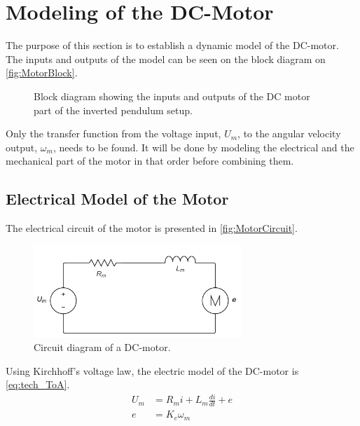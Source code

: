 \section{Modeling of the DC-Motor}
The purpose of this section is to establish a dynamic model of the DC-motor. The inputs and outputs of the model can be seen on the block diagram on \autoref{fig:MotorBlock}.
\begin{figure}[htbp]
\centering
{}
\caption{Block diagram showing the inputs and outputs of the DC motor part of the inverted pendulum setup.}
\label{fig:MotorBlock}
\end{figure}

Only the transfer function from the voltage input, $U_m$, to the angular velocity output, $\omega_m$, needs to be found. It will be done by modeling the electrical and the mechanical part of the motor in that order before combining them.

\subsection{Electrical Model of the Motor}
The electrical circuit of the motor is presented in \autoref{fig:MotorCircuit}.
\begin{figure}[htbp]
	\centering
 	\includegraphics[width=0.7\textwidth]{figures/modeling/Motor/MotorElectricCircuit.pdf} 
 	\caption{Circuit diagram of a DC-motor.}
 	\label{fig:MotorCircuit}
\end{figure}

Using Kirchhoff's voltage law, the electric model of the DC-motor is \autoref{eq:tech_ToA}.
\begin{subequations} \label{eq:tech_ToA}
	\begin{flalign}
		U_m &= R_m  i + L_m \frac{di}{dt} + e \\
		e &= K_e  \omega_m 
	\end{flalign}
\end{subequations}
\startexplain
\stopexplain

